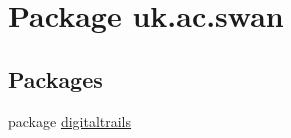 \hypertarget{namespaceuk_1_1ac_1_1swan}{\section{Package uk.\+ac.\+swan}
\label{namespaceuk_1_1ac_1_1swan}
}
\subsection*{Packages}
\begin{DoxyCompactItemize}
\item 
package \hyperlink{namespaceuk_1_1ac_1_1swan_1_1digitaltrails}{digitaltrails}
\end{DoxyCompactItemize}
